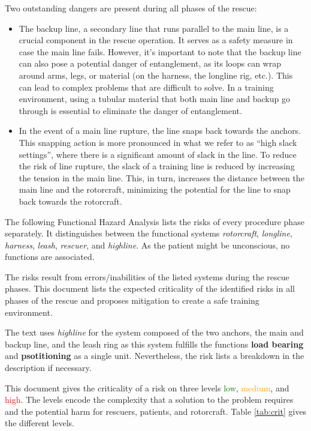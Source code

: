 \documentclass[a4paper,10pt]{scrartcl}
\begin{document}
Two outstanding dangers are present during all phases of the rescue:
\begin{itemize}
\item The backup line, a secondary line that runs parallel to the main line, is a crucial component in the rescue operation. It serves as a safety measure in case the main line fails. However, it's important to note that the backup line can also pose a potential danger of entanglement, as its loops can wrap around arms, legs, or material (on the harness, the longline rig, etc.). This can lead to complex problems that are difficult to solve. In a training environment, using a tubular material that both main line and backup go through is essential to eliminate the danger of entanglement.
\item In the event of a main line rupture, the line snaps back towards the anchors. This snapping action is more pronounced in what we refer to as ``high slack settings'', where there is a significant amount of slack in the line. To reduce the risk of line rupture, the slack of a training line is reduced by increasing the tension in the main line. This, in turn, increases the distance between the main line and the rotorcraft, minimizing the potential for the line to snap back towards the rotorcraft.
\end{itemize} 

The following Functional Hazard Analysis lists the risks of every procedure phase separately. It distinguishes between the functional systems \textit{rotorcraft}, \textit{longline}, \textit{harness}, \textit{leash}, \textit{rescuer}, and \textit{highline}. As the patient might be unconscious,   no functions are associated. 


The risks result from errors/inabilities of the listed systems during the rescue phases. This document lists the expected criticality of the identified risks in all phases of the rescue and proposes mitigation to create a safe training environment. 


The text uses \textit{highline} for the system composed of the two anchors, the main and backup line, and the leash ring as this system fulfills the functions \textbf{load bearing} and \textbf{psotitioning} as a single unit. Nevertheless, the risk lists a breakdown in the description if necessary. 


This document gives the criticality of a risk on three levels \textcolor{green}{low}, \textcolor{orange}{medium}, and \textcolor{red}{high}. The levels encode the complexity that a solution to the problem requires and the potential harm for rescuers, patients, and rotorcraft. Table \ref{tab:crit} gives the different levels.
\end{document}
